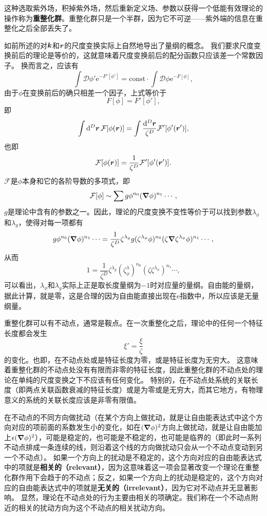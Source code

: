\documentclass[hyperref, UTF8, a4paper]{ctexart}
\newcommand*{\ee}{\mathrm{e}}
\newcommand*{\const}{\mathrm{const}}
\newcommand*{\fd}[1]{\mathcal{D}{#1}}
\begin{document}
这种选取紫外场，积掉紫外场，然后重新定义场、参数以获得一个低能有效理论的操作称为\textbf{重整化群}。重整化群只是一个半群，因为它不可逆——紫外端的信息在重整化之后全部丢失了。

如前所述的对$\vb*{k}$和$\vb*{r}$的尺度变换实际上自然地导出了量纲的概念。
我们要求尺度变换前后的理论是等价的，这就意味着尺度变换前后的配分函数只应该差一个常数因子。
换而言之，应该有
\[
    \int \fd{\phi'} \ee^{- F'[\phi']} = \const \cdot \int \fd{\phi} \ee^{ - F[\phi]},
\]
由于$\phi$在变换前后的确只相差一个因子，上式等价于
\[
    F[\phi] = F'[\phi'],
\]
即
\[
    \int \dd[D]{\vb*{r}} \mathcal{F}[\phi(\vb*{r})] = \int \frac{\dd[D]{\vb*{r}}}{\zeta^D} \mathcal{F}' [\phi'(\vb*{r}')],
\]
也即
\[
    \mathcal{F}[\phi(\vb*{r})] = \frac{1}{\zeta^D} \mathcal{F}' [\phi'(\vb*{r}')].
\]
$\mathcal{F}$是$\phi$本身和它的各阶导数的多项式，即
\[
    \mathcal{F}[\phi] \sim \sum g \phi^{n_0} (\grad{\phi})^{n_1} \cdots,
\]
$g$是理论中含有的参数之一。因此，理论的尺度变换不变性等价于可以找到参数$\lambda_\phi$和$\lambda_g$，使得对每一项都有
\[
    g \phi^{n_0} (\grad{\phi})^{n_1} \cdots = \frac{1}{\zeta^D} \zeta^{\lambda_g} g (\zeta^{\lambda_\phi} \phi)^{n_0} (\zeta \grad{\zeta^{\lambda_\phi} \phi})^{n_1} \cdots, 
\]
从而
\[
    1 = \frac{1}{\zeta^D} \zeta^{\lambda_g} (\zeta^\lambda_\phi)^{n_0} (\zeta \zeta^{\lambda_\phi})^{n_1} \cdots,
\]
可以看出，$\lambda_\phi$和$\lambda_g$实际上正是取长度量纲为$-1$时对应量的量纲。自由能的量纲，据此计算，就是零，这是合理的因为自由能直接出现在$\ee$指数中，所以应该是无量纲量。

重整化群可以有不动点，通常是鞍点。在一次重整化之后，理论中的任何一个特征长度都会发生
\[
    \xi' = \frac{\xi}{\zeta}
\]
的变化。也即，在不动点处或是特征长度为零，或是特征长度为无穷大。
这意味着重整化群的不动点处没有有限而非零的特征长度，因此重整化群的不动点处的理论在单纯的尺度变换之下不应该有任何变化。
特别的，在不动点处系统的关联长度（即两点关联函数衰减的特征长度）或是为零或是无穷大，而其它地方，有物理意义的系统的关联长度应该是非零有限值。

在不动点的不同方向做扰动（在某个方向上做扰动，就是让自由能表达式中这个方向对应的项前面的系数发生小的变化，如在$(\grad{\phi})^2$方向上做扰动，就是让自由能加上$\epsilon (\grad{\phi})^2$），可能是稳定的，也可能是不稳定的，也可能是临界的（即此时一系列不动点排成一条连续的线，则沿着这个线的方向做扰动只会从一个不动点变动到另一个不动点）。
如果一个方向上的扰动是不稳定的，这个方向对应的自由能表达式中的项就是\textbf{相关的（relevant）}，因为这意味着这一项会显著改变一个理论在重整化群作用下会趋于的不动点；反之，如果一个方向上的扰动是稳定的，这个方向对应的自由能表达式中的项就是\textbf{无关的（irrelevant）}，因为它对不动点并无显著影响。
显然，理论在不动点处的行为主要由相关的项确定。我们称在一个不动点附近的相关的扰动方向为这个不动点的相关扰动方向。
\end{document}
